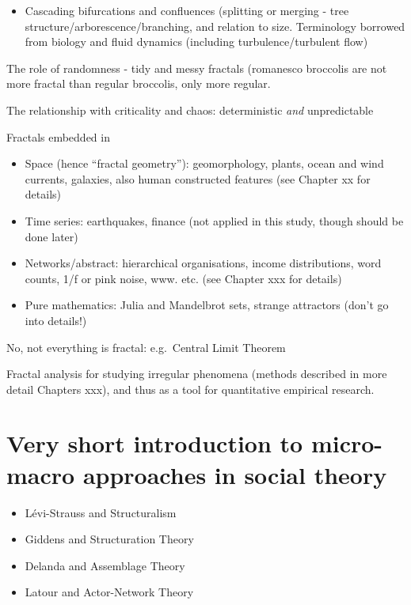 \documentclass[
  12pt,
]{book}
\providecommand{\tightlist}{%
  \setlength{\itemsep}{0pt}\setlength{\parskip}{0pt}}
\begin{document}
\begin{itemize}
\tightlist
\item
  Cascading bifurcations and confluences (splitting or merging - tree structure/arborescence/branching, and relation to size. Terminology borrowed from biology and fluid dynamics (including turbulence/turbulent flow)
\end{itemize}

The role of randomness - tidy and messy fractals (romanesco broccolis are not more fractal than regular broccolis, only more regular.

The relationship with criticality and chaos: deterministic \emph{and} unpredictable

Fractals embedded in

\begin{itemize}
\item
  Space (hence ``fractal geometry''): geomorphology, plants, ocean and wind currents, galaxies, also human constructed features (see Chapter xx for details)
\item
  Time series: earthquakes, finance (not applied in this study, though should be done later)
\item
  Networks/abstract: hierarchical organisations, income distributions, word counts, 1/f or pink noise, www. etc. (see Chapter xxx for details)
\item
  Pure mathematics: Julia and Mandelbrot sets, strange attractors (don't go into details!)
\end{itemize}

No, not everything is fractal: e.g.~Central Limit Theorem

Fractal analysis for studying irregular phenomena (methods described in more detail Chapters xxx), and thus as a tool for quantitative empirical research.

\hypertarget{very-short-introduction-to-micro-macro-approaches-in-social-theory}{%
\section{Very short introduction to micro-macro approaches in social theory}\label{very-short-introduction-to-micro-macro-approaches-in-social-theory}}

\begin{itemize}
\item
  Lévi-Strauss and Structuralism
\item
  Giddens and Structuration Theory
\item
  Delanda and Assemblage Theory
\item
  Latour and Actor-Network Theory
\end{itemize}
\end{document}

